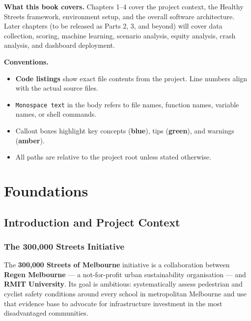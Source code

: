 \documentclass[11pt,a4paper,openany]{book}
\begin{document}
\textbf{What this book covers.}
Chapters 1--4 cover the project context, the Healthy Streets framework, environment setup, and the overall software architecture. Later chapters (to be released as Parts 2, 3, and beyond) will cover data collection, scoring, machine learning, scenario analysis, equity analysis, crash analysis, and dashboard deployment.

\textbf{Conventions.}
\begin{itemize}
  \item \textbf{Code listings} show exact file contents from the project. Line numbers align with the actual source files.
  \item \texttt{Monospace text} in the body refers to file names, function names, variable names, or shell commands.
  \item Callout boxes highlight key concepts (\textcolor{navyblue}{\textbf{blue}}), tips (\textcolor{regengreen}{\textbf{green}}), and warnings (\textcolor{amber!70!black}{\textbf{amber}}).
  \item All paths are relative to the project root unless stated otherwise.
\end{itemize}

\mainmatter

\part{Foundations}

\chapter{Introduction and Project Context}

\section{The 300,000 Streets Initiative}

The \textbf{300,000 Streets of Melbourne} initiative is a collaboration between \textbf{Regen Melbourne} --- a not-for-profit urban sustainability organisation --- and \textbf{RMIT University}. Its goal is ambitious: systematically assess pedestrian and cyclist safety conditions around every school in metropolitan Melbourne and use that evidence base to advocate for infrastructure investment in the most disadvantaged communities.
\end{document}
